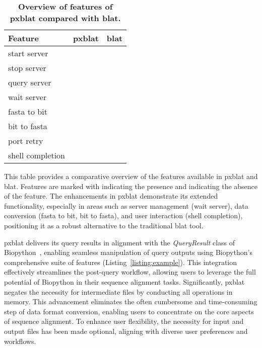 \documentclass[10pt,letterpaper]{article}
\newcommand{\cmark}{\ding{51}}%
\newcommand{\xmark}{\ding{55}}%
\begin{document}
\begin{table}[!ht]
	\centering
	\caption{{\bf Overview of features of \gls{pxblat} compared with \gls{blat}.}}\label{tab:apicmp}
	\begin{tabular}{@{}lll@{}}
		\toprule
		Feature          & \gls{pxblat} & \gls{blat} \\ \midrule
		start server     & \cmark{}     & \cmark{}   \\
		stop  server     & \cmark{}     & \cmark{}   \\
		query server     & \cmark{}     & \cmark{}   \\
		wait server      & \cmark{}     & \xmark{}   \\
		fasta to bit     & \cmark{}     & \xmark{}   \\
		bit to fasta     & \cmark{}     & \xmark{}   \\
		port retry       & \cmark{}     & \xmark{}   \\
		shell completion & \cmark{}     & \xmark{}   \\
		\bottomrule
	\end{tabular}
	\begin{flushleft}
		This table provides a comparative overview of the features available in \gls{pxblat} and \gls{blat}.
		Features are marked with \cmark{} indicating the presence and \xmark{} indicating the absence of the feature.
		The enhancements in \gls{pxblat} demonstrate its extended functionality, especially in areas such as server management (wait server), data conversion (fasta to bit, bit to fasta), and user interaction (shell completion), positioning it as a robust alternative to the traditional \gls{blat} tool.
	\end{flushleft}
\end{table}

\gls{pxblat} delivers its query results in alignment with the \emph{QueryResult} class of Biopython~\cite{cock2009biopython}, enabling seamless manipulation of query outputs using Biopython's comprehensive suite of features (Listing~\ref{listing:example}).
This integration effectively streamlines the post-query workflow, allowing users to leverage the full potential of Biopython in their sequence alignment tasks.
Significantly, \gls{pxblat} negates the necessity for intermediate files by conducting all operations in memory.
This advancement eliminates the often cumbersome and time-consuming step of data format conversion, enabling users to concentrate on the core aspects of sequence alignment.
To enhance user flexibility, the necessity for input and output files has been made optional, aligning with diverse user preferences and workflows.
\end{document}
